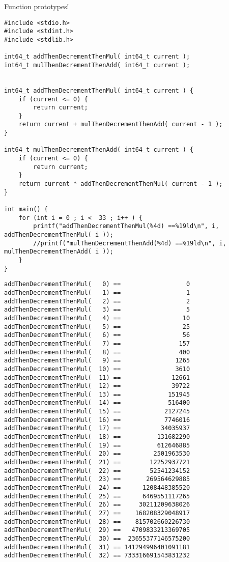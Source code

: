\documentclass[11pt]{article}
\begin{document}
Function prototypes!

\begin{verbatim}
#include <stdio.h>
#include <stdint.h>
#include <stdlib.h>

int64_t addThenDecrementThenMul( int64_t current );
int64_t mulThenDecrementThenAdd( int64_t current );


int64_t addThenDecrementThenMul( int64_t current ) {
    if (current <= 0) {
        return current;
    }
    return current + mulThenDecrementThenAdd( current - 1 );
}

int64_t mulThenDecrementThenAdd( int64_t current ) {
    if (current <= 0) {
        return current;
    }
    return current * addThenDecrementThenMul( current - 1 );
}

int main() {
    for (int i = 0 ; i <  33 ; i++ ) {
        printf("addThenDecrementThenMul(%4d) ==%19ld\n", i, addThenDecrementThenMul( i ));
        //printf("mulThenDecrementThenAdd(%4d) ==%19ld\n", i, mulThenDecrementThenAdd( i ));   
    }
}
\end{verbatim}

\begin{verbatim}
addThenDecrementThenMul(   0) ==                  0
addThenDecrementThenMul(   1) ==                  1
addThenDecrementThenMul(   2) ==                  2
addThenDecrementThenMul(   3) ==                  5
addThenDecrementThenMul(   4) ==                 10
addThenDecrementThenMul(   5) ==                 25
addThenDecrementThenMul(   6) ==                 56
addThenDecrementThenMul(   7) ==                157
addThenDecrementThenMul(   8) ==                400
addThenDecrementThenMul(   9) ==               1265
addThenDecrementThenMul(  10) ==               3610
addThenDecrementThenMul(  11) ==              12661
addThenDecrementThenMul(  12) ==              39722
addThenDecrementThenMul(  13) ==             151945
addThenDecrementThenMul(  14) ==             516400
addThenDecrementThenMul(  15) ==            2127245
addThenDecrementThenMul(  16) ==            7746016
addThenDecrementThenMul(  17) ==           34035937
addThenDecrementThenMul(  18) ==          131682290
addThenDecrementThenMul(  19) ==          612646885
addThenDecrementThenMul(  20) ==         2501963530
addThenDecrementThenMul(  21) ==        12252937721
addThenDecrementThenMul(  22) ==        52541234152
addThenDecrementThenMul(  23) ==       269564629885
addThenDecrementThenMul(  24) ==      1208448385520
addThenDecrementThenMul(  25) ==      6469551117265
addThenDecrementThenMul(  26) ==     30211209638026
addThenDecrementThenMul(  27) ==    168208329048917
addThenDecrementThenMul(  28) ==    815702660226730
addThenDecrementThenMul(  29) ==   4709833213369705
addThenDecrementThenMul(  30) ==  23655377146575200
addThenDecrementThenMul(  31) == 141294996401091181
addThenDecrementThenMul(  32) == 733316691543831232
\end{verbatim}
\end{document}
